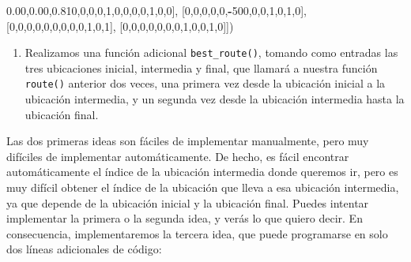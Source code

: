 \documentclass[
]{book}
\newenvironment{Shaded}{\begin{snugshade}}{\end{snugshade}}
\newcommand{\DecValTok}[1]{\textcolor[rgb]{0.00,0.00,0.81}{#1}}
\newcommand{\NormalTok}[1]{#1}
\newcommand{\OperatorTok}[1]{\textcolor[rgb]{0.81,0.36,0.00}{\textbf{#1}}}
\providecommand{\tightlist}{%
  \setlength{\itemsep}{0pt}\setlength{\parskip}{0pt}}
\begin{document}
\begin{Shaded}
\begin{Highlighting}[]
\NormalTok{          [}\DecValTok{0}\NormalTok{,}\DecValTok{0}\NormalTok{,}\DecValTok{0}\NormalTok{,}\DecValTok{0}\NormalTok{,}\DecValTok{1}\NormalTok{,}\DecValTok{0}\NormalTok{,}\DecValTok{0}\NormalTok{,}\DecValTok{0}\NormalTok{,}\DecValTok{0}\NormalTok{,}\DecValTok{1}\NormalTok{,}\DecValTok{0}\NormalTok{,}\DecValTok{0}\NormalTok{],}
\NormalTok{          [}\DecValTok{0}\NormalTok{,}\DecValTok{0}\NormalTok{,}\DecValTok{0}\NormalTok{,}\DecValTok{0}\NormalTok{,}\DecValTok{0}\NormalTok{,}\OperatorTok{{-}}\DecValTok{500}\NormalTok{,}\DecValTok{0}\NormalTok{,}\DecValTok{0}\NormalTok{,}\DecValTok{1}\NormalTok{,}\DecValTok{0}\NormalTok{,}\DecValTok{1}\NormalTok{,}\DecValTok{0}\NormalTok{],}
\NormalTok{          [}\DecValTok{0}\NormalTok{,}\DecValTok{0}\NormalTok{,}\DecValTok{0}\NormalTok{,}\DecValTok{0}\NormalTok{,}\DecValTok{0}\NormalTok{,}\DecValTok{0}\NormalTok{,}\DecValTok{0}\NormalTok{,}\DecValTok{0}\NormalTok{,}\DecValTok{0}\NormalTok{,}\DecValTok{1}\NormalTok{,}\DecValTok{0}\NormalTok{,}\DecValTok{1}\NormalTok{],}
\NormalTok{          [}\DecValTok{0}\NormalTok{,}\DecValTok{0}\NormalTok{,}\DecValTok{0}\NormalTok{,}\DecValTok{0}\NormalTok{,}\DecValTok{0}\NormalTok{,}\DecValTok{0}\NormalTok{,}\DecValTok{0}\NormalTok{,}\DecValTok{1}\NormalTok{,}\DecValTok{0}\NormalTok{,}\DecValTok{0}\NormalTok{,}\DecValTok{1}\NormalTok{,}\DecValTok{0}\NormalTok{]])}
\end{Highlighting}
\end{Shaded}

\begin{enumerate}
\def\labelenumi{\arabic{enumi}.}
\setcounter{enumi}{2}
\tightlist
\item
  Realizamos una función adicional \texttt{best\_route()}, tomando como entradas las tres ubicaciones inicial, intermedia y final, que llamará a nuestra función \texttt{route()} anterior dos veces, una primera vez desde la ubicación inicial a la ubicación intermedia, y un segunda vez desde la ubicación intermedia hasta la ubicación final.
\end{enumerate}

Las dos primeras ideas son fáciles de implementar manualmente, pero muy difíciles de implementar automáticamente. De hecho, es fácil encontrar automáticamente el índice de la ubicación intermedia donde queremos ir, pero es muy difícil obtener el índice de la ubicación que lleva a esa ubicación intermedia, ya que depende de la ubicación inicial y la ubicación final. Puedes intentar implementar la primera o la segunda idea, y verás lo que quiero decir. En consecuencia, implementaremos la tercera idea, que puede programarse en solo dos líneas adicionales de código:
\end{document}
